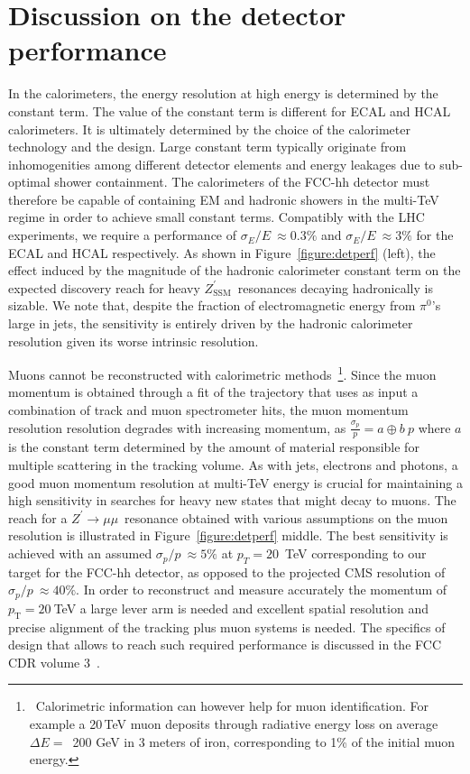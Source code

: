 \documentclass[a4paper,11pt]{article}
\newcommand{\ZpSSM}{\ensuremath{Z^{\prime}_{\mathrm{SSM}}}}
\newcommand*{\Zpmumu}{\ensuremath{Z^{\prime}\rightarrow \mu\mu}}
\newcommand{\pt}{\ensuremath{p_{\text{T}}}}
\begin{document}
\section{Discussion on the detector performance}
\label{sec:detperf}

In the calorimeters, the energy resolution at high energy is determined by the constant term. The value of the constant term is different for ECAL and HCAL calorimeters. It is ultimately determined by the choice of the calorimeter technology and the design. Large constant term typically originate from inhomogenities among different detector elements and energy leakages due to sub-optimal shower containment. The calorimeters of the FCC-hh detector must therefore be capable of containing EM and hadronic showers in the multi-TeV regime in order to achieve small constant terms.
Compatibly with the LHC experiments, we require a performance of $\sigma_E/E~ \approx 0.3 \%$ and $\sigma_E/E~ \approx 3\%$ for the ECAL and HCAL respectively. As shown in Figure~\ref{figure:detperf} (left), the effect induced by the magnitude of the hadronic calorimeter constant term on the expected discovery reach for heavy \ZpSSM\ resonances decaying hadronically is sizable. We note that, despite the fraction of electromagnetic energy from $\pi^0$'s large in jets, the sensitivity is entirely driven by the hadronic calorimeter resolution given its worse intrinsic resolution.

Muons cannot be reconstructed with calorimetric methods~\footnote{~Calorimetric information can however help for muon identification. For example a 20\,TeV muon deposits through radiative energy loss on average $\Delta E=$~200 GeV in 3 meters of iron, corresponding to 1\% of the initial muon energy.}. Since the muon momentum is obtained through a fit of the trajectory that uses as input a combination of track and muon spectrometer hits, the muon momentum resolution resolution degrades with increasing momentum, as $\frac{\sigma_p}{p}= a \oplus b~p$ where $a$ is the constant term determined by the amount of material responsible for multiple scattering in the tracking volume. As with jets, electrons and photons, a good muon momentum resolution at multi-TeV energy is crucial for maintaining a high sensitivity in searches for heavy new states that might decay to muons. The reach for a \Zpmumu\ resonance obtained with various assumptions on the muon resolution is illustrated in Figure~\ref{figure:detperf} middle. The best sensitivity is achieved with an assumed $\sigma_p/p~ \approx 5\%$ at $p_T = 20$~TeV corresponding to our target for the FCC-hh detector, as opposed to the projected CMS resolution of $\sigma_p/p~\approx 40\%$. In order to reconstruct and measure accurately the momentum of $\pt=20~$TeV a large lever arm is needed and excellent spatial resolution and precise alignment of the tracking plus muon systems is needed. The specifics of design that allows to reach such required performance is discussed in the FCC CDR volume 3~\cite{cdr_volume3}.
\end{document}
